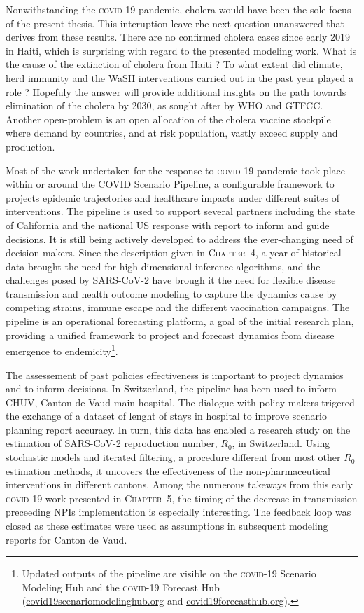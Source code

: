 Nonwithstanding the \textsc{covid}-19 pandemic, cholera would have been the sole focus of the present thesis. This interuption leave rhe next question unanswered  that derives from these results. There are no confirmed cholera cases since early 2019 in Haiti, which is surprising with regard to the presented modeling work. What is the cause of the extinction of cholera from Haiti ? To what extent did climate, herd immunity and the WaSH interventions carried out in the past year played a role ? Hopefuly the answer will provide additional insights on the path towards elimination of the cholera by 2030, as sought after by WHO and GTFCC. Another open-problem is an open allocation of the cholera vaccine stockpile where demand by countries, and at risk population, vastly exceed supply and production\cite{Pezzoli:GlobalOralCholera:2019}. 

Most of the work undertaken for the response to \textsc{covid}-19 pandemic took place within or around the COVID Scenario Pipeline, a configurable framework to projects epidemic trajectories and healthcare impacts under different suites of interventions. The pipeline is used to support several partners including the state of California and the national US response with report to inform and guide decisions. It is still being actively developed to address the ever-changing need of decision-makers. Since the description given in \textsc{Chapter~4}, a year of historical data brought the need for high-dimensional inference algorithms, and the challenges posed by SARS-CoV-2 have brough it the need for flexible disease transmission and health outcome modeling to capture the dynamics cause by competing strains, immune escape and the different vaccination campaigns. The pipeline is an operational forecasting platform, a goal of the initial research plan, providing a unified framework to project and forecast dynamics from disease emergence to endemicity\footnote{Updated outputs of the pipeline are visible on the \textsc{covid}-19 Scenario Modeling Hub and the \textsc{covid}-19 Forecast Hub (\url{covid19scenariomodelinghub.org} and \url{covid19forecasthub.org}).}.

The assessement of past policies effectiveness is important to project dynamics and to inform decisions. In Switzerland, the pipeline has been used to inform CHUV, Canton de Vaud main hospital. The dialogue with policy makers trigered the exchange of a dataset of lenght of stays in hospital to improve scenario planning report accuracy. In turn, this data has enabled a research study on the estimation of SARS-CoV-2 reproduction number, $R_0$, in Switzerland. Using stochastic models and iterated filtering, a procedure different from most other $R_0$ estimation methods, it uncovers the effectiveness of the non-pharmaceutical interventions in different cantons. Among the numerous takeways from this early \textsc{covid}-19 work presented in \textsc{Chapter~5}, the timing of the decrease in transmission preceeding NPIs implementation is especially interesting. The feedback loop was closed as these estimates were used as assumptions in subsequent modeling reports for Canton de Vaud.


